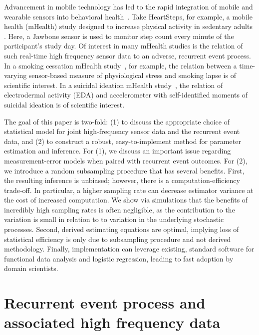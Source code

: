 \documentclass[11pt]{amsart}
\begin{document}
Advancement in mobile technology has led to the rapid integration of
mobile and wearable sensors into behavioral health~\citep{Freeetal2013}.
Take HeartSteps, for example, a mobile health (mHealth) study designed
to increase physical activity in sedentary adults
\citep{KlasnjaHS2019}. Here, a Jawbone sensor is used to monitor step
count every minute of the participant's study day.
Of interest in many mHealth studies is the relation of such
real-time high frequency sensor data to an adverse, recurrent event
process. In a smoking cessation mHealth study~\citep{Sense2Stop}, for
example, the relation between a time-varying sensor-based measure of
physiological stress and smoking lapse is of scientific interest.
In a suicidal ideation mHealth study~\citep{Kleiman2018}, the relation of
electrodermal activity (EDA) and accelerometer with self-identified
moments of suicidal ideation is of scientific interest.


The goal of this paper is two-fold: (1) to discuss the appropriate
choice of statistical model for joint high-frequency sensor data and
the recurrent event data, and (2) to construct a robust,
easy-to-implement method for parameter estimation and inference. 
For (1), we discuss an important issue regarding measurement-error
models when paired with recurrent event outcomes.
For (2), we introduce a random subsampling procedure that has
several benefits.  First, the resulting inference is unbiased;
however, there is a computation-efficiency trade-off. In particular, a
higher sampling rate can decrease estimator variance at the cost of
increased computation.  We show via simulations that the benefits of
incredibly high sampling rates is often negligible, as the
contribution to the variation is small in relation to to variation in
the underlying stochastic processes. Second, derived estimating
equations are optimal, implying loss of statistical efficiency is only
due to subsampling procedure and not derived methodology.  Finally,
implementation can leverage existing, standard software for functional
data analysis and logistic regression, leading to fast adoption by
domain scientists.  

\section{Recurrent event process and associated high frequency data}
\end{document}
